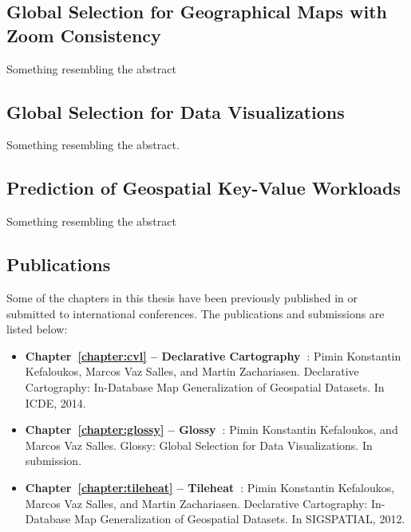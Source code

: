 \documentclass[11pt, oneside]{report}
\begin{document}
 
\subsection{Global Selection for Geographical Maps with Zoom Consistency}
\label{sec:introduction:contributions:cvl}

Something resembling the abstract

\subsection{Global Selection for Data Visualizations}
\label{sec:introduction:contributions:glossy}

Something resembling the abstract. 

\subsection{Prediction of Geospatial Key-Value Workloads}
\label{sec:introduction:contributions:tileheat}

Something resembling the abstract

\subsection{Publications}

Some of the chapters in this thesis have been previously published in or submitted to international conferences. The publications and submissions are listed below: 

\begin{itemize}
\item \textbf{Chapter~\ref{chapter:cvl} -- Declarative Cartography~\cite{declarative:cartography}}: Pimin Konstantin Kefaloukos, Marcos Vaz Salles, and Martin Zachariasen. Declarative Cartography: In-Database Map Generalization of Geospatial Datasets. In ICDE, 2014. 
\item \textbf{Chapter~\ref{chapter:glossy} -- Glossy~\cite{glossy}}: Pimin Konstantin Kefaloukos, and Marcos Vaz Salles. Glossy: Global Selection for Data Visualizations. In submission. 
\item \textbf{Chapter~\ref{chapter:tileheat} -- Tileheat~\cite{tileheat}}: Pimin Konstantin Kefaloukos, Marcos Vaz Salles, and Martin Zachariasen. Declarative Cartography: In-Database Map Generalization of Geospatial Datasets. In SIGSPATIAL, 2012. 
\end{itemize}
\end{document}
